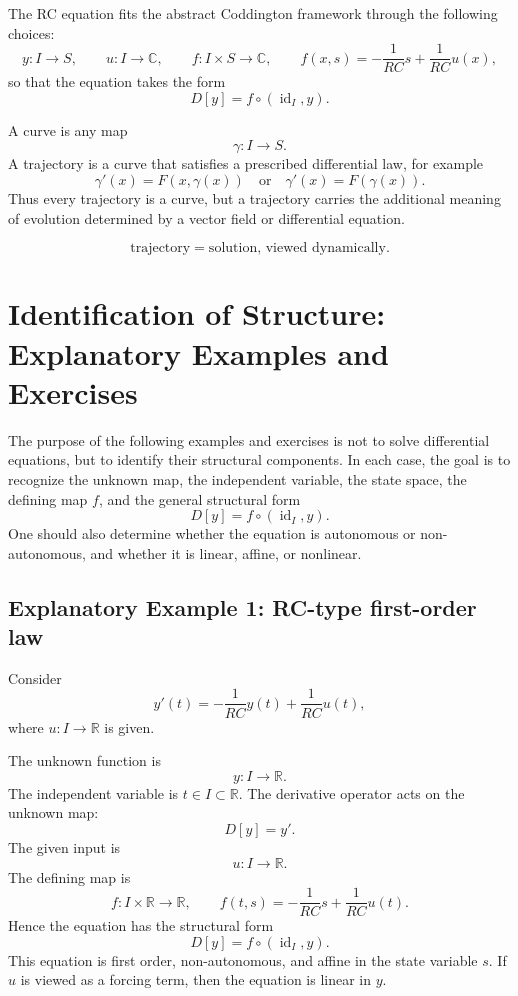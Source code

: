 \documentclass[12pt]{article}
\begin{document}
	The RC equation fits the abstract Coddington framework through the following choices:
	$$
	y:I\to S,
	\qquad
	u:I\to\mathbb{C},
	\qquad
	f:I\times S\to\mathbb{C},
	\qquad
	f(x,s)= -\frac{1}{RC}s+\frac{1}{RC}u(x),
	$$
	so that the equation takes the form
	$$
	D[y]=f\circ(\operatorname{id}_I,y).
	$$
	
	A curve is any map
	$$
	\gamma:I\to S.
	$$
	A trajectory is a curve that satisfies a prescribed differential law, for example
	$$
	\gamma'(x)=F(x,\gamma(x))
	\quad \text{or} \quad
	\gamma'(x)=F(\gamma(x)).
	$$
	Thus every trajectory is a curve, but a trajectory carries the additional meaning of evolution determined by a vector field or differential equation.
	
	\[
	\text{trajectory} = \text{solution, viewed dynamically}.
	\]
	
	\section*{Identification of Structure: Explanatory Examples and Exercises}
	
	The purpose of the following examples and exercises is not to solve differential equations, but to identify their structural components. In each case, the goal is to recognize the unknown map, the independent variable, the state space, the defining map \(f\), and the general structural form
	$$
	D[y]=f\circ(\operatorname{id}_I,y).
	$$
	One should also determine whether the equation is autonomous or non-autonomous, and whether it is linear, affine, or nonlinear.
	
	\subsection*{Explanatory Example 1: RC-type first-order law}
	
	Consider
	$$
	y'(t)=-\frac{1}{RC}y(t)+\frac{1}{RC}u(t),
	$$
	where \(u:I\to\mathbb{R}\) is given.
	
	The unknown function is
	$$
	y:I\to\mathbb{R}.
	$$
	The independent variable is \(t\in I\subset\mathbb{R}\). The derivative operator acts on the unknown map:
	$$
	D[y]=y'.
	$$
	The given input is
	$$
	u:I\to\mathbb{R}.
	$$
	The defining map is
	$$
	f:I\times\mathbb{R}\to\mathbb{R},
	\qquad
	f(t,s)=-\frac{1}{RC}s+\frac{1}{RC}u(t).
	$$
	Hence the equation has the structural form
	$$
	D[y]=f\circ(\operatorname{id}_I,y).
	$$
	This equation is first order, non-autonomous, and affine in the state variable \(s\). If \(u\) is viewed as a forcing term, then the equation is linear in \(y\).
	
\end{document}
